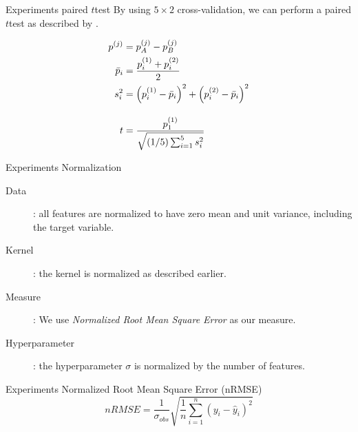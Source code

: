 \documentclass[aspectratio=169]{beamer}
\begin{document}
\begin{frame}{Experiments \textendash{} paired $t$\textendash{}test}
	By using $5\times{}2$ cross-validation, we can perform a paired $t$\textendash{}test
	as described by \textcite{dietterichApproximateStatisticalTests1998}.

	\begin{align}
		p^{(j)}   & = p_A^{(j)} - p_B^{(j)}                                                       \notag \\
		\bar{p}_i & = \frac{p_i^{(1)} + p_i^{(2)}}{2}                                             \notag \\
		s_i^2     & = \left(p_i^{(1)} - \bar{p}_i\right)^2 + \left(p_i^{(2)} - \bar{p}_i\right)^2 \notag \\[1em]
		t         & = \frac{p_1^{(1)}}{\sqrt{(1/5)\sum_{i=1}^5 s_i^2}}
	\end{align}

\end{frame}

\begin{frame}{Experiments \textendash{} Normalization}
	\begin{description}
		\item[Data]: all features are normalized to have zero mean and unit variance, including the target variable.
		\item[Kernel]: the kernel is normalized as described earlier.
		\item[Measure]: We use \emph{Normalized Root Mean Square Error} as our measure.
		\item[Hyperparameter]: the hyperparameter $\sigma$ is normalized by the number of features.
	\end{description}
\end{frame}

\begin{frame}{Experiments \textendash{} Normalized Root Mean Square Error (nRMSE)}
	\begin{equation}
		nRMSE = \frac{1}{\sigma_{obs}}\sqrt{\frac{1}{n}\sum_{i=1}^n (y_i - \hat{y}_i)^2}
	\end{equation}
\end{frame}
\end{document}
